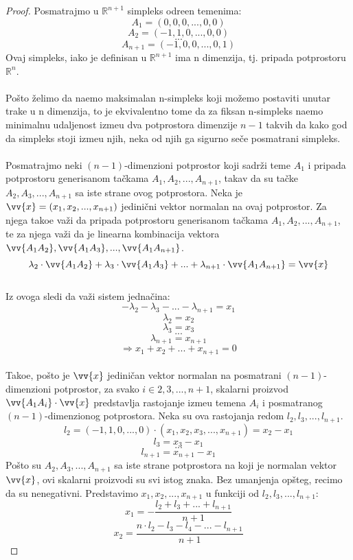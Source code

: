 \documentclass[11pt,letter]{article}
\begin{document}
\begin{proof}
Posmatrajmo u $\mathbb{R}^{n+1}$ simpleks odre\dj en temenima:
$$A_1=(0, 0, 0, ..., 0, 0)$$
$$A_2=(-1, 1, 0, ..., 0, 0)$$
$$...$$
$$A_{n+1}=(-1,0,0,..., 0, 1)$$
Ovaj simpleks, iako je definisan u $\mathbb{R}^{n+1}$ ima n dimenzija, tj. pripada potprostoru $\mathbb{R}^n$. 
 \\
\\
\indent Po\v sto \v zelimo da na\dj emo maksimalan n-simpleks koji mo\v zemo postaviti unutar trake u n dimenzija, to je ekvivalentno tome da za fiksan n-simpleks na\dj emo minimalnu udaljenost izme\dj u dva potprostora dimenzije $n-1$ takvih da kako god da simpleks stoji izme\dj u njih, neka od njih ga sigurno se\v ce posmatrani simpleks.
\\
\\
\indent Posmatrajmo neki $(n-1)$-dimenzioni potprostor koji sadr\v zi teme $A_1$ i pripada potprostoru generisanom ta\v ckama $A_1, A_2,..., A_{n+1}$, takav da su ta\v cke $A_2, A_3,..., A_{n+1}$ sa iste strane ovog potprostora. Neka je $\vv{x}=(x_1, x_2,..., x_{n+1})$ jedini\v cni vektor normalan na ovaj potprostor. Za njega tako\dj e va\v zi da pripada potprostoru generisanom ta\v ckama $A_1, A_2,..., A_{n+1}$, te za njega va\v zi da je linearna kombinacija vektora $\vv{A_1A_2}, \vv{A_1A_3},...,\vv{A_1 A_{n+1}}$.
\\
$$\lambda_2 \cdot \vv{A_1A_2}+\lambda_3 \cdot \vv{A_1A_3}+...+\lambda_{n+1}\cdot \vv{A_1A_{n+1}}=\vv{x}$$
\\
Iz ovoga sledi da va\v zi sistem jedna\v cina:
$$ -\lambda_2-\lambda_3-...-\lambda_{n+1}=x_1$$
$$\lambda_2=x_2$$
$$\lambda_3=x_3$$
$$...$$
$$\lambda_{n+1}=x_{n+1}$$
$$\Rightarrow x_1+x_2+...+x_{n+1}=0 $$
\\
Tako\dj e, po\v sto je $\vv{x}$ jedini\v can vektor normalan na posmatrani $(n-1)$-dimenzioni potprostor, za svako $i\in {2, 3,..., n+1}$, skalarni proizvod $\vv{A_1A_i}\cdot \vv{x}$ predstavlja rastojanje izme\dj u temena $A_i$ i posmatranog $(n-1)$-dimenzionog potprostora. Neka su ova rastojanja redom $l_2, l_3,..., l_{n+1}$.
$$l_2=(-1, 1, 0,..., 0)\cdot (x_1, x_2, x_3,..., x_{n+1})=x_2-x_1$$
$$l_3=x_3-x_1$$
$$...$$
$$l_{n+1}=x_{n+1}-x_1$$
Po\v sto su $A_2, A_3,..., A_{n+1}$ sa iste strane potprostora na koji je normalan vektor $\vv{x}$, ovi skalarni proizvodi su svi istog znaka. Bez umanjenja op\v steg, recimo da su nenegativni.
Predstavimo $x_1, x_2,..., x_{n+1}$ u funkciji od $l_2, l_3,..., l_{n+1}$:
$$x_1=-\frac{l_2+l_3+...+l_{n+1}}{n+1}$$
$$x_2=\frac{n\cdot l_2-l_3-l_4-...-l_{n+1}}{n+1}$$

\end{proof}
\end{document}

